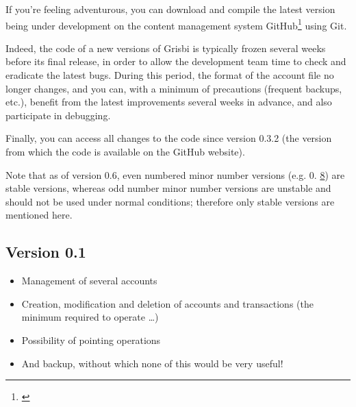 If you're feeling adventurous, you can download and compile the latest version being under development on the content management system \gls{GitHub}\footnote{\urlGitHubGrisbi{}\label{siteGitHubGrisbi}} using \gls{Git}.

Indeed, the code of a new versions of Grisbi is typically frozen several weeks before its final release, in order to allow the development team time to check and eradicate the latest bugs. During this period, the format of the account file no longer changes, and you can, with a minimum of precautions (frequent backups, etc.), benefit from the latest improvements several weeks in advance, and also participate in debugging.

Finally, you can access all changes to the code since version 0.3.2 (the version from which the code is available on the \gls{GitHub} website).

Note that as of version 0.6, even numbered minor number versions (e.g. 0. \underline8) are stable versions, whereas odd number minor number versions are unstable and should not be used under normal conditions; therefore only stable versions are mentioned here.


\subsection{Version 0.1}

\begin{itemize}
	\item Management of several accounts%
	\item Creation, modification and deletion of accounts and transactions (the minimum required to operate  \dots{})%
	\item Possibility of pointing operations%
	\item And backup, without which none of this would be very useful!%
\end{itemize}

